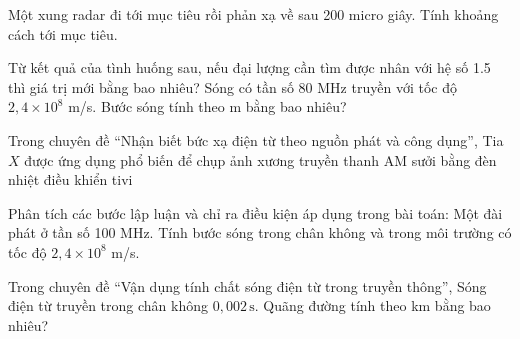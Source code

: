 \begin{ex}
Một xung radar đi tới mục tiêu rồi phản xạ về sau 200 micro giây. Tính khoảng cách tới mục tiêu.
\choiceTF

\end{ex}

\begin{ex}
Từ kết quả của tình huống sau, nếu đại lượng cần tìm được nhân với hệ số 1.5 thì giá trị mới bằng bao nhiêu? Sóng có tần số 80 MHz truyền với tốc độ $2,4\times10^8$ m/s. Bước sóng tính theo m bằng bao nhiêu?
\end{ex}

\begin{ex}
Trong chuyên đề “Nhận biết bức xạ điện từ theo nguồn phát và công dụng”, Tia $X$ được ứng dụng phổ biến để
\choice
{\True chụp ảnh xương}
{truyền thanh AM}
{sưởi bằng đèn nhiệt}
{điều khiển tivi}
\end{ex}

\begin{ex}
Phân tích các bước lập luận và chỉ ra điều kiện áp dụng trong bài toán: Một đài phát ở tần số 100 MHz. Tính bước sóng trong chân không và trong môi trường có tốc độ $2,4\times10^8$ m/s.
\choiceTF

\end{ex}

\begin{ex}
Trong chuyên đề “Vận dụng tính chất sóng điện từ trong truyền thông”, Sóng điện từ truyền trong chân không $0,002\,\text{s}$. Quãng đường tính theo km bằng bao nhiêu?
\end{ex}

